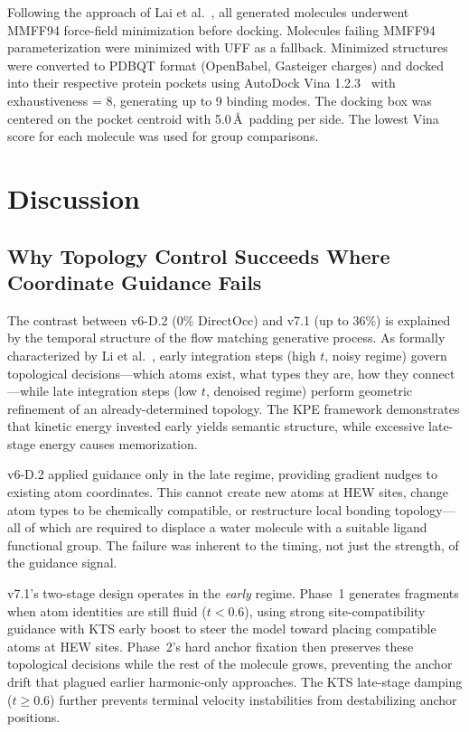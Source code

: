 \documentclass[11pt,letterpaper]{article}
\begin{document}
Following the approach of Lai et al.~\cite{lai2025force}, all generated
molecules underwent MMFF94 force-field minimization before docking.  Molecules
failing MMFF94 parameterization were minimized with UFF as a fallback.
Minimized structures were converted to PDBQT format (OpenBabel, Gasteiger
charges) and docked into their respective protein pockets using AutoDock Vina
1.2.3~\cite{trott2010} with exhaustiveness = 8, generating up to 9 binding
modes.  The docking box was centered on the pocket centroid with 5.0\,\AA\
padding per side.  The lowest Vina score for each molecule was used for
group comparisons.

\section{Discussion}

\subsection{Why Topology Control Succeeds Where Coordinate Guidance Fails}

The contrast between v6-D.2 (0\% DirectOcc) and v7.1 (up to 36\%) is explained
by the temporal structure of the flow matching generative process.  As formally
characterized by Li et al.~\cite{li2026kpe}, early integration steps (high $t$,
noisy regime) govern topological decisions---which atoms exist, what types they
are, how they connect---while late integration steps (low $t$, denoised regime)
perform geometric refinement of an already-determined topology.  The KPE
framework demonstrates that kinetic energy invested early yields semantic
structure, while excessive late-stage energy causes memorization.

v6-D.2 applied guidance only in the late regime, providing gradient nudges to
existing atom coordinates.  This cannot create new atoms at HEW sites, change
atom types to be chemically compatible, or restructure local bonding
topology---all of which are required to displace a water molecule with a
suitable ligand functional group.  The failure was inherent to the timing, not
just the strength, of the guidance signal.

v7.1's two-stage design operates in the \emph{early} regime.  Phase~1 generates
fragments when atom identities are still fluid ($t < 0.6$), using strong
site-compatibility guidance with KTS early boost to steer the model toward
placing compatible atoms at HEW sites.  Phase~2's hard anchor fixation then
preserves these topological decisions while the rest of the molecule grows,
preventing the anchor drift that plagued earlier harmonic-only approaches.
The KTS late-stage damping ($t \ge 0.6$) further prevents terminal velocity
instabilities from destabilizing anchor positions.
\end{document}
